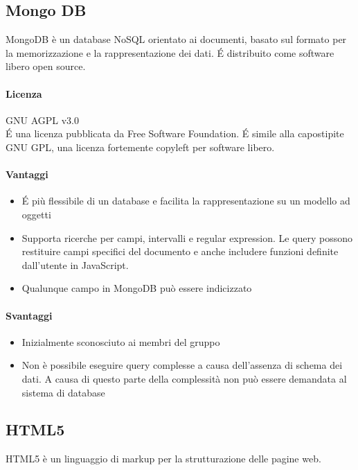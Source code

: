 \subsection{Mongo DB}
MongoDB è un database NoSQL orientato ai documenti, basato sul formato  per la memorizzazione e la rappresentazione dei dati. \'E distribuito come software libero open source. \\

\paragraph{Licenza} GNU AGPL v3.0 \\
\'E una licenza pubblicata da Free Software Foundation. \'E simile alla capostipite GNU GPL, una licenza fortemente copyleft per software libero.

\paragraph{Vantaggi}
\begin{itemize}
	\item \'E più flessibile di un database  e facilita la rappresentazione su un modello ad
	oggetti
	\item Supporta ricerche per campi, intervalli e regular expression. Le query possono restituire campi specifici del documento e anche includere funzioni definite dall'utente in JavaScript.
	\item Qualunque campo in MongoDB può essere indicizzato 
\end{itemize}


\paragraph{Svantaggi} 
\begin{itemize}
	\item Inizialmente sconosciuto ai membri del gruppo
     \item Non è possibile eseguire query complesse a causa
       dell'assenza di schema dei dati. A causa di questo parte della
       complessità non può essere demandata al sistema di database
\end{itemize}

\subsection{HTML5}
HTML5 è un linguaggio di markup per la strutturazione delle pagine web.

